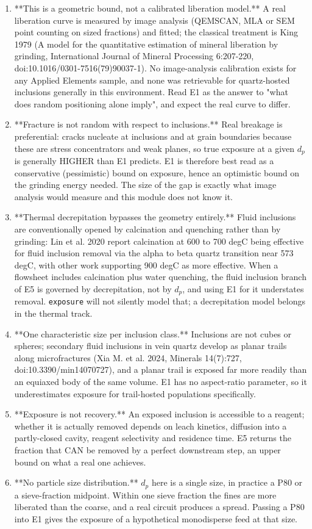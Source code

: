 \documentclass[10pt,a4paper,twoside]{report}
\begin{document}
\begin{enumerate}[leftmargin=*,label=\arabic*.]
\item **This is a geometric bound, not a calibrated liberation model.** A real liberation curve is measured by image analysis (QEMSCAN, MLA or SEM point counting on sized fractions) and fitted; the classical treatment is King 1979 (A model for the quantitative estimation of mineral liberation by grinding, International Journal of Mineral Processing 6:207-220, doi:10.1016/0301-7516(79)90037-1). No image-analysis calibration exists for any Applied Elements sample, and none was retrievable for quartz-hosted inclusions generally in this environment. Read E1 as the answer to "what does random positioning alone imply", and expect the real curve to differ.
\item **Fracture is not random with respect to inclusions.** Real breakage is preferential: cracks nucleate at inclusions and at grain boundaries because these are stress concentrators and weak planes, so true exposure at a given $d_p$ is generally HIGHER than E1 predicts. E1 is therefore best read as a conservative (pessimistic) bound on exposure, hence an optimistic bound on the grinding energy needed. The size of the gap is exactly what image analysis would measure and this module does not know it.
\item **Thermal decrepitation bypasses the geometry entirely.** Fluid inclusions are conventionally opened by calcination and quenching rather than by grinding: Lin et al. 2020 report calcination at 600 to 700 degC being effective for fluid inclusion removal via the alpha to beta quartz transition near 573 degC, with other work supporting 900 degC as more effective. When a flowsheet includes calcination plus water quenching, the fluid inclusion branch of E5 is governed by decrepitation, not by $d_p$, and using E1 for it understates removal. \texttt{exposure} will not silently model that; a decrepitation model belongs in the thermal track.
\item **One characteristic size per inclusion class.** Inclusions are not cubes or spheres; secondary fluid inclusions in vein quartz develop as planar trails along microfractures (Xia M. et al. 2024, Minerals 14(7):727, doi:10.3390/min14070727), and a planar trail is exposed far more readily than an equiaxed body of the same volume. E1 has no aspect-ratio parameter, so it underestimates exposure for trail-hosted populations specifically.
\item **Exposure is not recovery.** An exposed inclusion is accessible to a reagent; whether it is actually removed depends on leach kinetics, diffusion into a partly-closed cavity, reagent selectivity and residence time. E5 returns the fraction that CAN be removed by a perfect downstream step, an upper bound on what a real one achieves.
\item **No particle size distribution.** $d_p$ here is a single size, in practice a P80 or a sieve-fraction midpoint. Within one sieve fraction the fines are more liberated than the coarse, and a real circuit produces a spread. Passing a P80 into E1 gives the exposure of a hypothetical monodisperse feed at that size.
\end{enumerate}
\end{document}
